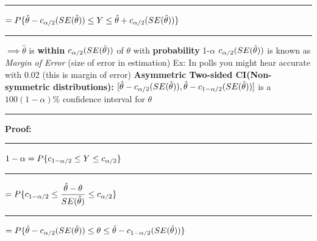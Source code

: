 \documentclass[]{article}
\begin{document}
\newline\Large\rule{4.3cm}{0pt}  $=  P \{ \hat\theta -c_{\alpha \\/ 2} (SE(\hat\theta))  \le Y \le \hat\theta +c_{\alpha \\/ 2}(SE(\hat\theta))  \} $
\newline
\newline\Large\rule{4.3cm}{0pt} $\implies \hat\theta$ is \textbf{within} $c_{\alpha \\/ 2} (SE(\hat\theta))$ of $\theta$ with \textbf{probability}  1-$\alpha$
\newline
\newline $c_{\alpha \\/ 2} (SE(\hat\theta))$ is known as \textit{Margin of Error} (size of error in estimation)
\newline Ex: In polls you might hear accurate with 0.02 (this is margin of error)
\newline
\newline\Large\textbf{Asymmetric Two-sided CI(Non-symmetric distributions):}
\newline $[ \hat\theta - c_{\alpha \\/ 2}(SE(\hat\theta)),  \hat\theta - c_{1- \alpha \\/ 2}(SE(\hat\theta))]$ is a $100(1-\alpha)\%$ confidence interval for $\theta$
\newline 
\newline\Large\rule{3.0cm}{0pt} \textbf{Proof:}
\newline\Large\rule{3.0cm}{0pt}  $ 1 - \alpha =  P \{ c_{1- \alpha \\/ 2} \le Y \le c_{\alpha \\/ 2}  \}$
\newline
\newline\Large\rule{4.3cm}{0pt}  $=  P \{ c_{1- \alpha \\/ 2} \le \dfrac{\hat{\theta} - \theta}{ SE(\hat{\theta})}  \le c_{\alpha \\/ 2}  \}$
\newline
\newline\Large\rule{4.3cm}{0pt}  $=  P \{ \hat\theta - c_{\alpha \\/ 2}(SE(\hat\theta))  \le \theta \le \hat\theta - c_{1- \alpha \\/ 2}(SE(\hat\theta))  \} $
\newline
\end{document}
